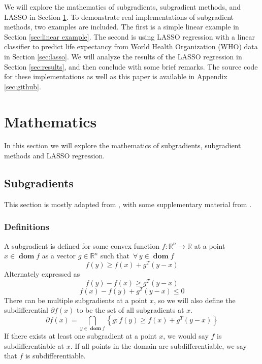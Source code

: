 \documentclass[journal,onecolumn]{IEEEtran}
\DeclareMathOperator{\dom}{\mathbf{dom}}
\let\oldforall\forall
\renewcommand{\forall}{ \, \oldforall \, }
\begin{document}
We will explore the mathematics of subgradients, subgradient methods, and LASSO in Section \ref{sec:math}. To demonstrate real implementations of subgradient methods, two examples are included. The first is a simple linear example in Section \ref{sec:linear example}. The second is using LASSO regression with a linear classifier to predict life expectancy from World Health Organization (WHO) data \cite{dataset} in Section \ref{sec:lasso}. We will analyze the results of the LASSO regression in Section \ref{sec:results}, and then conclude with some brief remarks. The source code for these implementations as well as this paper is available in Appendix \ref{sec:github}.


\section{Mathematics}\label{sec:math}
In this section we will explore the mathematics of subgradients, subgradient methods and LASSO regression.
\subsection{Subgradients}\label{sec:math subgrad}
This section is mostly adapted from \cite{boydvandenberghesubgradient}, with some supplementary material from \cite{boydparksubgradients}.
\subsubsection{Definitions}
A subgradient is defined for some convex function \(f: \mathbb{R}^n \rightarrow \mathbb{R}\) at a point \(x \in \dom f\) as a vector \(g \in \mathbb{R}^n\) such that \(\forall y \in \dom f\)
\begin{equation}\label{eq:subgradient def}
f(y) \geq f(x) + g^T (y-x) 
\end{equation}
Alternately expressed as
\begin{equation}\label{eq:modified subradient def 2}
    f(y) - f(x) \geq g^T(y-x)
\end{equation}
\begin{equation}\label{eq:modified subgradient def}
    f(x) - f(y) + g^T(y-x) \leq 0
\end{equation}
There can be multiple subgradients at a point \(x\), so we will also define the subdifferential \(\partial f(x)\) to be the set of all subgradients at \(x\).
\begin{equation}\label{eq:math subdifferential}
\partial f(x) = \bigcap_{y \in \dom f} \left\{ g : f(y) \geq f(x) + g^T (y-x)\right\}
\end{equation}
If there exists at least one subgradient at a point \(x\), we would say \(f\) is subdifferentiable at \(x\). If all points in the domain are subdifferentiable, we say that \(f\) is subdifferentiable.
\end{document}
